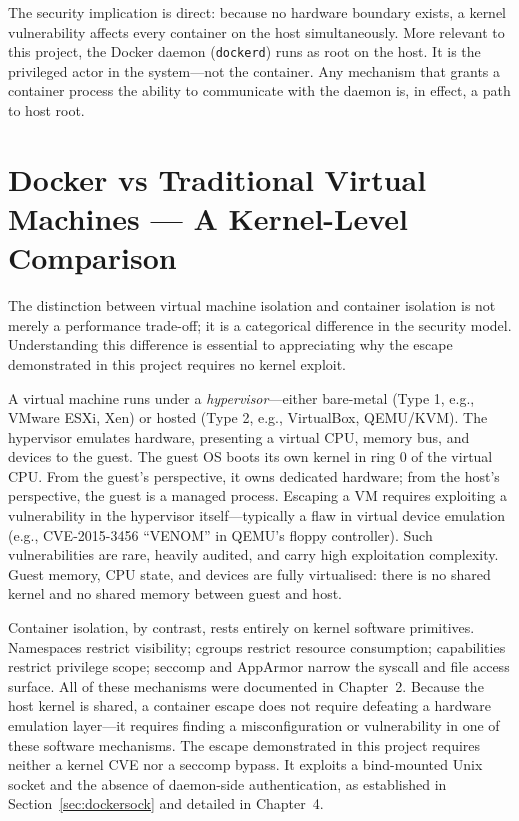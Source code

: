 The security implication is direct: because no hardware boundary exists, a kernel
vulnerability affects every container on the host simultaneously. More relevant to
this project, the Docker daemon (\texttt{dockerd}) runs as root on the host. It is
the privileged actor in the system---not the container. Any mechanism that grants a
container process the ability to communicate with the daemon is, in effect, a path to
host root.


\section{Docker vs Traditional Virtual Machines --- A Kernel-Level Comparison}

The distinction between virtual machine isolation and container isolation is not
merely a performance trade-off; it is a categorical difference in the security model.
Understanding this difference is essential to appreciating why the escape demonstrated
in this project requires no kernel exploit.

A virtual machine runs under a \textit{hypervisor}---either bare-metal (Type 1,
e.g., VMware ESXi, Xen) or hosted (Type 2, e.g., VirtualBox, QEMU/KVM). The
hypervisor emulates hardware, presenting a virtual CPU, memory bus, and devices to
the guest. The guest OS boots its own kernel in ring 0 of the virtual CPU. From the
guest's perspective, it owns dedicated hardware; from the host's perspective, the
guest is a managed process. Escaping a VM requires exploiting a vulnerability in the
hypervisor itself---typically a flaw in virtual device emulation (e.g., CVE-2015-3456
``VENOM'' in QEMU's floppy controller). Such vulnerabilities are rare, heavily
audited, and carry high exploitation complexity. Guest memory, CPU state, and devices
are fully virtualised: there is no shared kernel and no shared memory between guest
and host.

Container isolation, by contrast, rests entirely on kernel software primitives.
Namespaces restrict visibility; cgroups restrict resource consumption; capabilities
restrict privilege scope; seccomp and AppArmor narrow the syscall and file access
surface. All of these mechanisms were documented in Chapter~2. Because the host
kernel is shared, a container escape does not require defeating a hardware emulation
layer---it requires finding a misconfiguration or vulnerability in one of these
software mechanisms. The escape demonstrated in this project requires neither a
kernel CVE nor a seccomp bypass. It exploits a bind-mounted Unix socket and the
absence of daemon-side authentication, as established in Section~\ref{sec:dockersock}
and detailed in Chapter~4.

